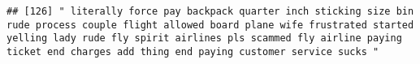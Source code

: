 \documentclass[
]{article}
\begin{document}
\begin{verbatim}
## [126] " literally force pay backpack quarter inch sticking size bin rude process couple flight allowed board plane wife frustrated started yelling lady rude fly spirit airlines pls scammed fly airline paying ticket end charges add thing end paying customer service sucks "                                                                                                                                                                                                                                                                                                                                                                                                                                                                                                                                                                                                                                                                                                                                                                                                                                                                                                                                                                                                                                                                                                                                                                                                                                                                                                                                                                                                                                                                                                                      

\end{verbatim}
\end{document}
